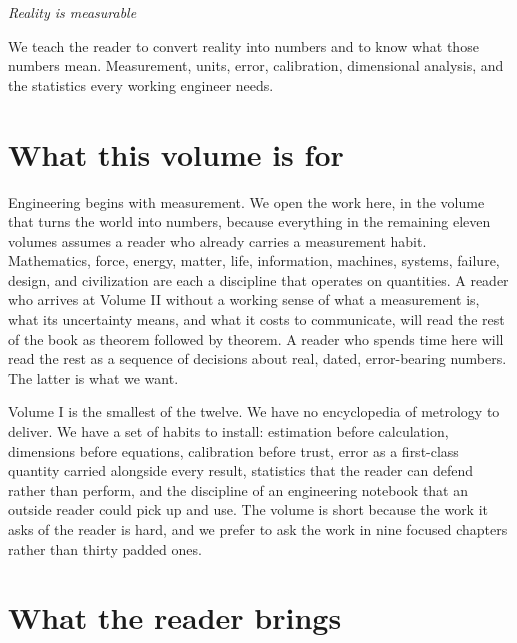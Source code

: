 
\vspace*{1.5cm}
\begin{center}
\itshape\large
Reality is measurable
\end{center}
\vspace{0.5cm}

\noindent
We teach the reader to convert reality into numbers and to know what those numbers mean. Measurement, units, error, calibration, dimensional analysis, and the statistics every working engineer needs.

\vspace{0.5cm}

\section*{What this volume is for}

Engineering begins with measurement. We open the work here, in the
volume that turns the world into numbers, because everything in the
remaining eleven volumes assumes a reader who already carries a
measurement habit. Mathematics, force, energy, matter, life,
information, machines, systems, failure, design, and civilization are
each a discipline that operates on quantities. A reader who arrives
at Volume II without a working sense of what a measurement is, what
its uncertainty means, and what it costs to communicate, will read
the rest of the book as theorem followed by theorem. A reader who
spends time here will read the rest as a sequence of decisions about
real, dated, error-bearing numbers. The latter is what we want.

Volume I is the smallest of the twelve. We have no encyclopedia of
metrology to deliver. We have a set of habits to install: estimation
before calculation, dimensions before equations, calibration before
trust, error as a first-class quantity carried alongside every
result, statistics that the reader can defend rather than perform,
and the discipline of an engineering notebook that an outside reader
could pick up and use. The volume is short because the work it asks
of the reader is hard, and we prefer to ask the work in nine
focused chapters rather than thirty padded ones.

\section*{What the reader brings}

